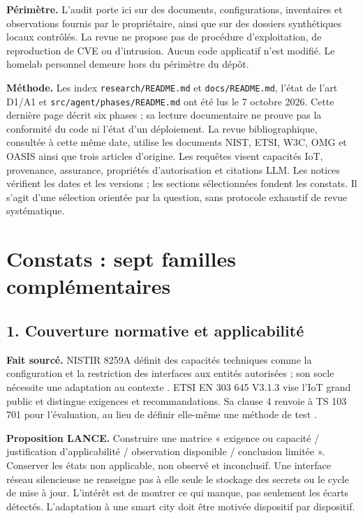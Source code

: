 \documentclass[11pt,a4paper]{article}
\begin{document}
\textbf{Périmètre.} L'audit porte ici sur des documents, configurations, inventaires et observations fournis par le propriétaire, ainsi que sur des dossiers synthétiques locaux contrôlés. La revue ne propose pas de procédure d'exploitation, de reproduction de CVE ou d'intrusion. Aucun code applicatif n'est modifié. Le homelab personnel demeure hors du périmètre du dépôt.

\textbf{Méthode.} Les index \texttt{research/README.md} et \texttt{docs/README.md}, l'état de l'art D1/A1 et \texttt{src/agent/phases/README.md} ont été lus le 7 octobre 2026. Cette dernière page décrit six phases ; sa lecture documentaire ne prouve pas la conformité du code ni l'état d'un déploiement. La revue bibliographique, consultée à cette même date, utilise les documents NIST, ETSI, W3C, OMG et OASIS ainsi que trois articles d'origine. Les requêtes visent capacités IoT, provenance, assurance, propriétés d'autorisation et citations LLM. Les notices vérifient les dates et les versions ; les sections sélectionnées fondent les constats. Il s'agit d'une sélection orientée par la question, sans protocole exhaustif de revue systématique.

\section{Constats : sept familles complémentaires}
\subsection*{1. Couverture normative et applicabilité}
\textbf{Fait sourcé.} NISTIR 8259A définit des capacités techniques comme la configuration et la restriction des interfaces aux entités autorisées ; son socle nécessite une adaptation au contexte \cite{nist8259}. ETSI EN 303 645 V3.1.3 vise l'IoT grand public et distingue exigences et recommandations. Sa clause 4 renvoie à TS 103 701 pour l'évaluation, au lieu de définir elle-même une méthode de test \cite{etsi645,etsi701}.

\textbf{Proposition LANCE.} Construire une matrice « exigence ou capacité / justification d'applicabilité / observation disponible / conclusion limitée ». Conserver les états non applicable, non observé et inconclusif. Une interface réseau silencieuse ne renseigne pas à elle seule le stockage des secrets ou le cycle de mise à jour. L'intérêt est de montrer ce qui manque, pas seulement les écarts détectés. L'adaptation à une smart city doit être motivée dispositif par dispositif.
\end{document}
